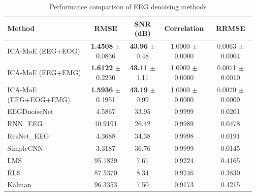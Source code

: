 
\begin{table}[htbp]
\centering
\caption{Performance comparison of EEG denoising methods}
\label{tab:comparison}
\begin{tabular}{lcccc}
\toprule
Method & RMSE & SNR (dB) & Correlation & RRMSE \\
\midrule
ICA-MoE (EEG+EOG) & \textbf{1.4508} $\pm$ 0.0836 & \textbf{43.96} $\pm$ 0.48 & 1.0000 $\pm$ 0.0000 & 0.0063 $\pm$ 0.0004 \\
ICA-MoE (EEG+EMG) & \textbf{1.6122} $\pm$ 0.2230 & \textbf{43.11} $\pm$ 1.11 & 1.0000 $\pm$ 0.0000 & 0.0071 $\pm$ 0.0010 \\
ICA-MoE (EEG+EOG+EMG) & \textbf{1.5936} $\pm$ 0.1951 & \textbf{43.19} $\pm$ 0.99 & 1.0000 $\pm$ 0.0000 & 0.0070 $\pm$ 0.0009 \\
\midrule
EEGDnoiseNet & 4.5867 & 33.95 & 0.9999 & 0.0201 \\
RNN_EEG & 10.9191 & 26.42 & 0.9989 & 0.0478 \\
ResNet_EEG & 4.3688 & 34.38 & 0.9998 & 0.0191 \\
SimpleCNN & 3.3187 & 36.76 & 0.9999 & 0.0145 \\
LMS & 95.1829 & 7.61 & 0.9224 & 0.4165 \\
RLS & 87.5370 & 8.34 & 0.9246 & 0.3830 \\
Kalman & 96.3353 & 7.50 & 0.9173 & 0.4215 \\
\bottomrule
\end{tabular}
\end{table}
